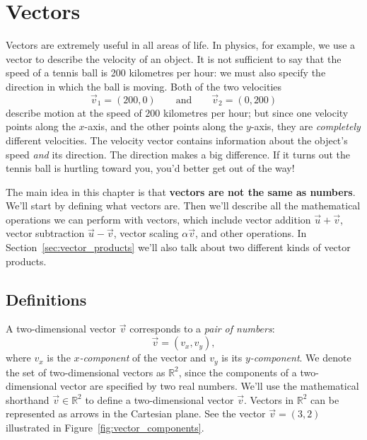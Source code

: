 
\section{Vectors}
\label{sec:vectors}

	Vectors are extremely useful in all areas of life.
	In physics, for example, we use a vector to describe the velocity of an object.
	It is not sufficient to say that the speed of a tennis ball is 200 kilometres per hour:
	we must also specify the direction in which the ball is moving.
	Both of the two velocities 
	\[
	 \vec{v}_1 = (200,0) 
	 \qquad \textrm{and}
	 \qquad \vec{v}_2=(0,200)
	\]
	describe motion at the speed of $200$ kilometres per hour;
	but since one velocity points along the $x$-axis, and the other points along the $y$-axis,
	they are \emph{completely} different velocities. 
	The velocity vector contains information about the object's speed \emph{and} its direction.
	The direction makes a big difference.
	If it turns out the tennis ball is hurtling toward you, you'd better get out of the way!

	The main idea in this chapter is that \textbf{vectors are not the same as numbers}.
	We'll start by defining what vectors are.
	Then we'll describe all the mathematical operations we can perform with vectors,
	which include
		vector addition $\vec{u}+\vec{v}$, 
		vector subtraction $\vec{u}-\vec{v}$,
		vector scaling $\alpha\vec{v}$,
		and other operations.
	In Section~\ref{sec:vector_products} we'll also talk about two different kinds of vector products.


	\subsection{Definitions}
	\label{vectors:definitions}

		A two-dimensional vector $\vec{v}$ corresponds to a \emph{pair of numbers}:
		\[
			\vec{v} = (v_x, v_y),
		\]
		where $v_x$ is the \emph{$x$-component} of the vector and $v_y$ is its \emph{$y$-component}.					
		We denote the set of two-dimensional vectors as $\mathbb{R}^2$,
		since the components of a two-dimensional vector are specified by two real numbers.
		We'll use the mathematical shorthand $\vec{v} \in \mathbb{R}^2$ to define a two-dimensional vector $\vec{v}$.
		Vectors in $\mathbb{R}^2$ can be represented as arrows in the Cartesian plane.
		See the vector $\vec{v}=(3,2)$ illustrated in Figure~\ref{fig:vector_components}.

